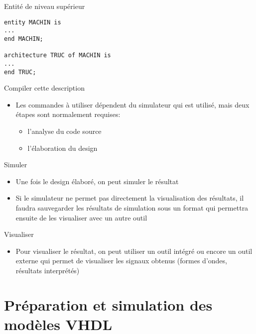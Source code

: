 \documentclass[presentation]{beamer}
\begin{document}
\begin{frame}[label={sec:org0c5752e},fragile]{Entité de niveau supérieur}
 \begin{verbatim}
entity MACHIN is
...
end MACHIN;

architecture TRUC of MACHIN is
...
end TRUC;
\end{verbatim}
\end{frame}

\begin{frame}[label={sec:org2a9d8dd}]{Compiler cette description}
\begin{itemize}
\item Les commandes à utiliser dépendent du simulateur qui est utilisé, mais deux étapes sont normalement requises:
\begin{itemize}
\item l'\alert{analyse} du code source
\item l'\alert{élaboration} du design
\end{itemize}
\end{itemize}
\end{frame}

\begin{frame}[label={sec:orgfc8663f}]{Simuler}
\begin{itemize}
\item Une fois le design élaboré, on peut \alert{simuler} le résultat
\item Si le simulateur ne permet pas directement la visualisation des résultats, il faudra sauvegarder les résultats de simulation sous un format qui permettra ensuite de les visualiser avec un autre outil
\end{itemize}
\end{frame}

\begin{frame}[label={sec:orgd964903}]{Visualiser}
\begin{itemize}
\item Pour \alert{visualiser} le résultat, on peut utiliser un outil intégré ou encore un outil externe qui permet de visualiser les signaux obtenus  (formes d'ondes, résultats interprétés)
\end{itemize}
\end{frame}

\section{Préparation et simulation des modèles VHDL}
\label{sec:org399c076}
\end{document}
